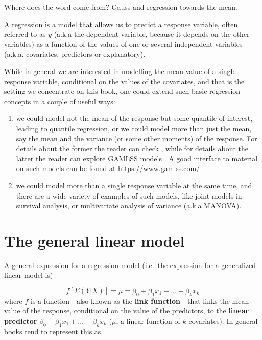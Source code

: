 \documentclass[
]{book}
\begin{document}
Where does the word come from? Gauss and regression towards the mean.

A regression is a model that allows us to predict a response variable, often referred to as \(y\) (a.k.a the dependent variable, because it depends on the other variables) as a function of the values of one or several independent variables (a.k.a. covariates, predictors or explanatory).

While in general we are interested in modelling the mean value of a single response variable, conditional on the values of the covariates, and that is the setting we concentrate on this book, one could extend such basic regression concepts in a couple of useful ways:

\begin{enumerate}
\def\labelenumi{\arabic{enumi}.}
\item
  we could model not the mean of the response but some quantile of interest, leading to quantile regression, or we could model more than just the mean, say the mean and the variance (or some other moments) of the response. For details about the former the reader can check \citet{Cade2003}, while for details about the latter the reader can explore GAMLSS models \citet{Stasinopoulos2017}. A good interface to material on such models can be found at \url{https://www.gamlss.com/}
\item
  we could model more than a single response variable at the same time, and there are a wide variety of examples of such models, like joint models in survival analysis, or multivariate analysis of variance (a.k.a MANOVA).
\end{enumerate}

\hypertarget{the-general-linear-model}{%
\section{The general linear model}\label{the-general-linear-model}}

A general expression for a regression model (i.e.~the expression for a generalized linear model is)

\[ f[E(Y|X)] = \mu = \beta_0+\beta_1 x_1 + ... + \beta_k x_k \]
where \(f\) is a function - also known as the \textbf{link function} - that links the mean value of the response, conditional on the value of the predictors, to the \textbf{linear predictor} \(\beta_0+\beta_1 x_1 + ... + \beta_k x_k\) (\(\mu\), a linear function of \(k\) covariates). In general books tend to represent this as
\end{document}
